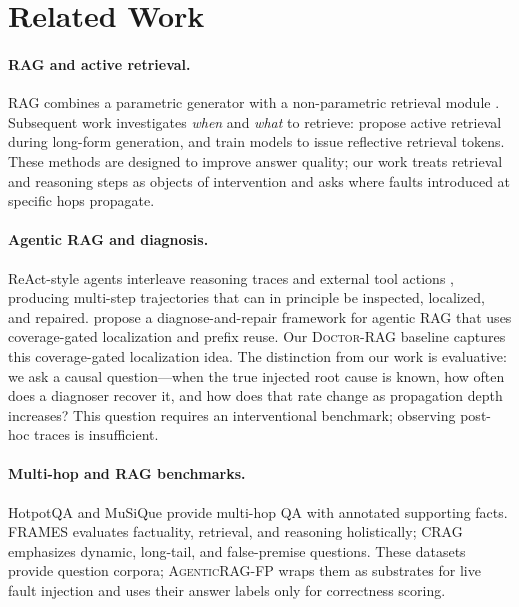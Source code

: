 \documentclass[11pt]{article}
\newcommand{\ours}{\textnormal{\textsc{AgenticRAG-FP}}}
\newcommand{\dr}{\textnormal{\textsc{Doctor-RAG}}}
\begin{document}
\section{Related Work}

\paragraph{RAG and active retrieval.}
RAG combines a parametric generator with a non-parametric retrieval module
\citep{lewis2020rag}.  Subsequent work investigates \emph{when} and \emph{what}
to retrieve: \citet{jiang2023flare} propose active retrieval during long-form
generation, and \citet{asai2023selfrag} train models to issue reflective
retrieval tokens.  These methods are designed to improve answer quality; our
work treats retrieval and reasoning steps as objects of intervention and asks
where faults introduced at specific hops propagate.

\paragraph{Agentic RAG and diagnosis.}
ReAct-style agents interleave reasoning traces and external tool actions
\citep{yao2022react}, producing multi-step trajectories that can in principle be
inspected, localized, and repaired.  \citet{jiao2026doctorrag} propose a
diagnose-and-repair framework for agentic RAG that uses coverage-gated
localization and prefix reuse.  Our \dr{} baseline captures this
coverage-gated localization idea.  The distinction from our work is evaluative:
we ask a causal question---when the true injected root cause is known, how
often does a diagnoser recover it, and how does that rate change as propagation
depth increases?  This question requires an interventional benchmark; observing
post-hoc traces is insufficient.

\paragraph{Multi-hop and RAG benchmarks.}
HotpotQA \citep{yang2018hotpotqa} and MuSiQue \citep{trivedi2021musique}
provide multi-hop QA with annotated supporting facts.  FRAMES
\citep{krishna2024frames} evaluates factuality, retrieval, and reasoning
holistically; CRAG \citep{yang2024crag} emphasizes dynamic, long-tail, and
false-premise questions.  These datasets provide question corpora; \ours{}
wraps them as substrates for live fault injection and uses their answer labels
only for correctness scoring.
\end{document}
